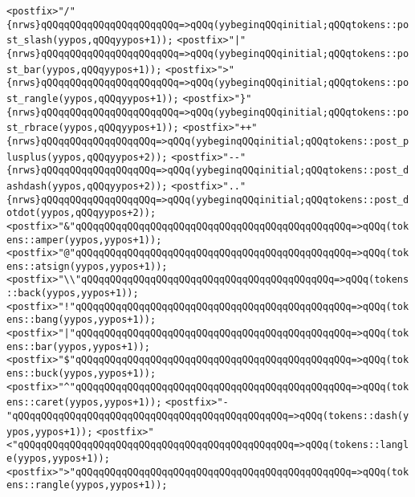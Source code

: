 \verb|<postfix>"/"{nrws}qQQqqQQqqQQqqQQqqQQqqQQq=>qQQq(yybeginqQQqinitial;qQQqtokens::post_slash(yypos,qQQqyypos+1));|\newline
\verb|<postfix>"|\verb#|"{nrws}qQQqqQQqqQQqqQQqqQQqqQQq=>qQQq(yybeginqQQqinitial;qQQqtokens::post_bar(yypos,qQQqyypos+1));#\newline
\verb|<postfix>">"{nrws}qQQqqQQqqQQqqQQqqQQqqQQq=>qQQq(yybeginqQQqinitial;qQQqtokens::post_rangle(yypos,qQQqyypos+1));|\newline
\verb|<postfix>"}"{nrws}qQQqqQQqqQQqqQQqqQQqqQQq=>qQQq(yybeginqQQqinitial;qQQqtokens::post_rbrace(yypos,qQQqyypos+1));|\newline
\verb|<postfix>"++"{nrws}qQQqqQQqqQQqqQQqqQQq=>qQQq(yybeginqQQqinitial;qQQqtokens::post_plusplus(yypos,qQQqyypos+2));|\newline
\verb|<postfix>"--"{nrws}qQQqqQQqqQQqqQQqqQQq=>qQQq(yybeginqQQqinitial;qQQqtokens::post_dashdash(yypos,qQQqyypos+2));|\newline
\verb|<postfix>".."{nrws}qQQqqQQqqQQqqQQqqQQq=>qQQq(yybeginqQQqinitial;qQQqtokens::post_dotdot(yypos,qQQqyypos+2));|\newline
\verb|<postfix>"&"qQQqqQQqqQQqqQQqqQQqqQQqqQQqqQQqqQQqqQQqqQQqqQQq=>qQQq(tokens::amper(yypos,yypos+1));|\newline
\verb|<postfix>"@"qQQqqQQqqQQqqQQqqQQqqQQqqQQqqQQqqQQqqQQqqQQqqQQq=>qQQq(tokens::atsign(yypos,yypos+1));|\newline
\verb|<postfix>"\\"qQQqqQQqqQQqqQQqqQQqqQQqqQQqqQQqqQQqqQQqqQQq=>qQQq(tokens::back(yypos,yypos+1));|\newline
\verb|<postfix>"!"qQQqqQQqqQQqqQQqqQQqqQQqqQQqqQQqqQQqqQQqqQQqqQQq=>qQQq(tokens::bang(yypos,yypos+1));|\newline
\verb|<postfix>"|\verb#|"qQQqqQQqqQQqqQQqqQQqqQQqqQQqqQQqqQQqqQQqqQQqqQQq=>qQQq(tokens::bar(yypos,yypos+1));#\newline
\verb|<postfix>"$"qQQqqQQqqQQqqQQqqQQqqQQqqQQqqQQqqQQqqQQqqQQqqQQq=>qQQq(tokens::buck(yypos,yypos+1));|\newline
\verb|<postfix>"^"qQQqqQQqqQQqqQQqqQQqqQQqqQQqqQQqqQQqqQQqqQQqqQQq=>qQQq(tokens::caret(yypos,yypos+1));|\newline
\verb|<postfix>"-"qQQqqQQqqQQqqQQqqQQqqQQqqQQqqQQqqQQqqQQqqQQqqQQq=>qQQq(tokens::dash(yypos,yypos+1));|\newline
\verb|<postfix>"<"qQQqqQQqqQQqqQQqqQQqqQQqqQQqqQQqqQQqqQQqqQQqqQQq=>qQQq(tokens::langle(yypos,yypos+1));|\newline
\verb|<postfix>">"qQQqqQQqqQQqqQQqqQQqqQQqqQQqqQQqqQQqqQQqqQQqqQQq=>qQQq(tokens::rangle(yypos,yypos+1));|\newline
